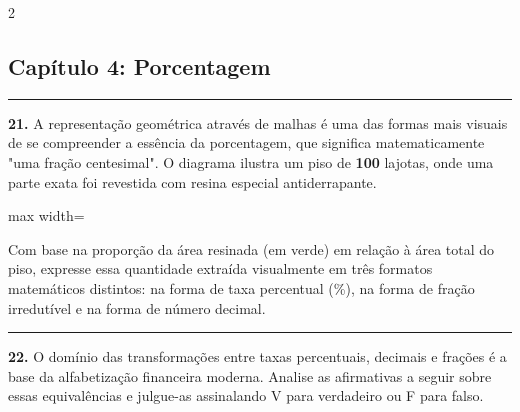 \documentclass[twoside, 10pt, a4paper]{article}
\newlength{\espacoPosTitulo}
\newlength{\espacoPreQuestao}
\newlength{\espacoQuestao}
\begin{document}
\begin{multicols*}{2}
\subsection*{Capítulo 4: Porcentagem}
\vspace{-0.2cm}\noindent\rule{\linewidth}{1.5pt} 
\par\vspace{\espacoPosTitulo}
\textbf{21.} A representação geométrica através de malhas é uma das formas mais visuais de se compreender a essência da porcentagem, que significa matematicamente "uma fração centesimal". O diagrama ilustra um piso de \textbf{100} lajotas, onde uma parte exata foi revestida com resina especial antiderrapante.

\begin{center}
\begin{adjustbox}{max width=\linewidth}
\end{adjustbox}
\end{center}

Com base na proporção da área resinada (em verde) em relação à área total do piso, expresse essa quantidade extraída visualmente em três formatos matemáticos distintos: na forma de taxa percentual (\%), na forma de fração irredutível e na forma de número decimal.
\par\vspace{\espacoQuestao}

\noindent\textcolor{CorLinha}{\rule{\linewidth}{0.5pt}} 
\par\vspace{\espacoPreQuestao}
\textbf{22.} O domínio das transformações entre taxas percentuais, decimais e frações é a base da alfabetização financeira moderna. Analise as afirmativas a seguir sobre essas equivalências e julgue-as assinalando V para verdadeiro ou F para falso. 


\end{multicols*}
\end{document}
